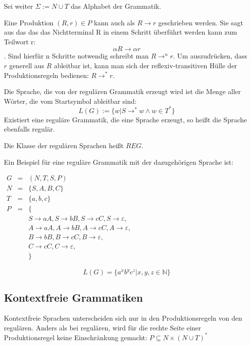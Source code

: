 \documentclass[]{article}
\begin{document}
Sei weiter $\Sigma := N \cup T$ das Alphabet der Grammatik.

Eine Produktion $(R,r)\in P$ kann auch als $R\rightarrow r$ geschrieben werden.
Sie sagt aus das das das Nichtterminal R in einem Schritt überführt werden kann zum Teilwort r:
\[ \alpha R \rightarrow \alpha r \]. Sind hierfür n Schritte notwendig schreibt man
$R \rightarrow^n r$. Um auszudrücken, dass $r$ generell aus $R$ ableitbar ist, kann man sich der reflexiv-transitiven Hülle der Produktionsregeln bedienen: $R \rightarrow ^* r$.

Die Sprache, die von der regulären Grammatik erzeugt wird ist die Menge aller Wörter, die vom Startsymbol ableitbar sind: 
\[ L(G) := \{w | S \rightarrow^* w \land w\in T^* \} \]
Existiert eine reguläre Grammatik, die eine Sprache erzeugt, so heißt die Sprache ebenfalls regulär.

Die Klasse der regulären Sprachen heißt $REG$.

Ein Beispiel für eine reguläre Grammatik mit der dazugehörigen Sprache ist: 

\begin{center}
 $
\begin{array}{rcl}
  G &=& (N,T,S,P) \\
  N &=& \{ S, A, B, C \} \\
  T &=& \{ a, b, c \} \\
  P &=& \{ \\ 
  &&  S \rightarrow a A,
    S \rightarrow b B,
    S \rightarrow c C,
    S \rightarrow \varepsilon,\\
  &&  A \rightarrow a A,
    A \rightarrow b B,
    A \rightarrow c C,
    A \rightarrow \varepsilon,\\
  &&  B \rightarrow b B,
    B \rightarrow c C,
    B \rightarrow \varepsilon, \\
  &&  C \rightarrow c C,
    C \rightarrow \varepsilon,\\
  &&\}
\end{array}
$ 
\end{center}

\[ L(G) = \{ a^xb^yc^z | x,y,z\in \mathbb{N} \} \] 

\subsection{Kontextfreie Grammatiken}

Kontextfreie Sprachen unterscheiden sich nur in den Produktionsregeln von den regulären. Anders als bei regulären, wird für die rechte Seite einer Produktionsregel keine Einschränkung gemacht: $P \subseteq N\times (N\cup T)^*$
\end{document}
